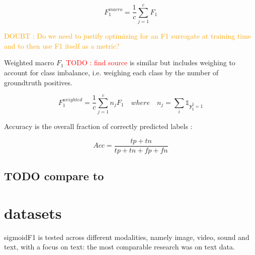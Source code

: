 \documentclass[sigconf,natbib,screen=true,review=true,anonymous]{acmart}
\newcommand\todo[1]{\textcolor{red}{TODO : #1}}
\newcommand\doubt[1]{\textcolor{orange}{DOUBT : #1}}
\begin{document}
$$F_1^{macro} = \frac{1}{c} \sum_{j=1}^c F_1$$

\doubt{Do we need to justify optimizing for an F1 surrogate at training time and to then use F1 itself as a metric?}

Weighted macro \(F_1\) \todo{find source} is similar but includes weighing to account for class imbalance, i.e. weighing each class by the number of groundtruth positives.

$$F_1^{weighted} = \frac{1}{c} \sum_{j=1}^c n_j F_1 \quad where \quad n_j = \sum_i \mathds{1}_{\mathbf{y_i^j} = 1}$$


Accuracy is the overall fraction of correctly predicted labels \cite{threshForF1}:

$$
A c c=\frac{t p+t n}{t p+t n+f p+f n}
$$




\subsection*{{\color{red}\bfseries\sffamily TODO} compare to  \cite{lossComp}}
\label{sec:org64510ed}
\clearpage

\section{datasets}
\label{sec:org41ab5ed}

sigmoidF1 is tested across different modalities, namely image, video, sound and text, with a focus on text: the most comparable research was on text data.

\end{document}
